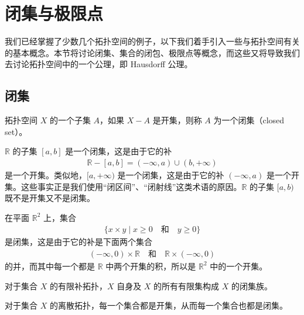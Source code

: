 \documentclass[../../main.tex]{subfiles}
\begin{document}
\section{闭集与极限点}\label{section:ch02-闭集与极限点}

我们已经掌握了少数几个拓扑空间的例子，以下我们着手引入一些与拓扑空间有关的基本概念。本节将讨论闭集、集合的闭包、极限点等概念，而这些又将导致我们去讨论拓扑空间中的一个公理，即 Hausdorff 公理。

\subsection*{闭集}

拓扑空间 $X$ 的一个子集 $A$，如果 $X - A$ 是开集，则称 $A$ 为一个闭集（closed set）。

\begin{example}\label{example:ch02-闭集1}
$\mathbb{R}$ 的子集 $[a, b]$ 是一个闭集，这是由于它的补
\begin{align*}
\mathbb{R} - [a, b] = (-\infty, a) \cup (b, +\infty)
\end{align*}
是一个开集。类似地，$[a, +\infty)$ 是一个闭集，这是由于它的补 $(-\infty, a)$ 是一个开集。这些事实正是我们使用“闭区间”、“闭射线”这类术语的原因。$\mathbb{R}$ 的子集 $[a, b)$ 既不是开集又不是闭集。
\end{example}

\begin{example}\label{example:ch02-闭集2}
在平面 $\mathbb{R}^{2}$ 上，集合
\begin{align*}
\{x \times y \mid x \geqslant 0 \quad \text{和} \quad y \geqslant 0\}
\end{align*}
是闭集，这是由于它的补是下面两个集合
\begin{align*}
(-\infty, 0) \times \mathbb{R} \quad \text{和} \quad \mathbb{R} \times (-\infty, 0)
\end{align*}
的并，而其中每一个都是 $\mathbb{R}$ 中两个开集的积，所以是 $\mathbb{R}^{2}$ 中的一个开集。
\end{example}

\begin{example}\label{example:ch02-闭集3}
对于集合 $X$ 的有限补拓扑，$X$ 自身及 $X$ 的所有有限集构成 $X$ 的闭集族。
\end{example}

\begin{example}\label{example:ch02-闭集4}
对于集合 $X$ 的离散拓扑，每一个集合都是开集，从而每一个集合也都是闭集。
\end{example}
\end{document}
